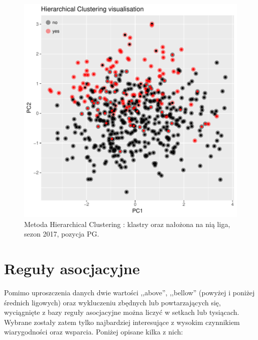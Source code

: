\documentclass[twoside,twocolumn]{article}
\begin{document}
\begin{figure}[hbt!]
  \centering
    \includegraphics[width=\linewidth]{plot_hclust.pdf}
  \caption{Metoda Hierarchical Clustering : klastry oraz nałożona na nią liga, sezon 2017, pozycja PG.}
  \label{fig:coffee}
\end{figure}

\newpage
\section{Reguły asocjacyjne}

\indent Pomimo uproszczenia danych dwie wartości ,,above'', ,,bellow'' (powyżej i poniżej średnich ligowych) oraz wykluczeniu zbędnych lub powtarzających się, wyciągnięte z bazy reguły asocjacyjne można liczyć w setkach lub tysiącach. Wybrane zostały zatem tylko najbardziej interesujące z wysokim czynnikiem wiarygodności oraz wsparcia. Poniżej opisane kilka z nich:
\end{document}
